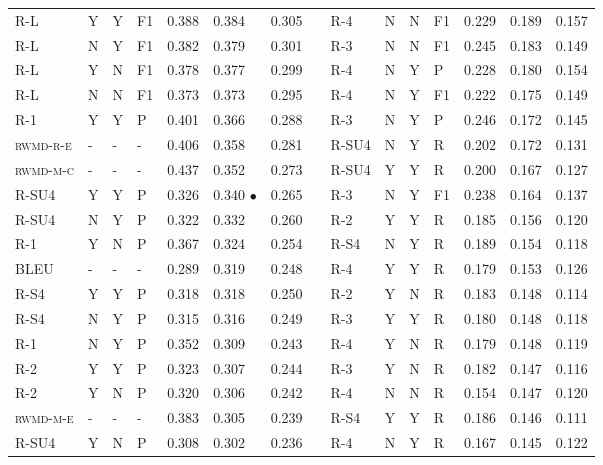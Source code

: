 \documentclass[11pt,a4paper]{article}
\begin{document}
\begin{table}[]
{\begin{tabular}{lllllllllllllll}
\textsc{R-L} & Y & Y & F1 & 0.388 & 0.384 & 0.305 &  & \textsc{R-4} & N & N & F1 & 0.229 & 0.189 & 0.157 \\
\textsc{R-L} & N & Y & F1 & 0.382 & 0.379 & 0.301 &  & \textsc{R-3} & N & N & F1 & 0.245 & 0.183 & 0.149 \\
\textsc{R-L} & Y & N & F1 & 0.378 & 0.377 & 0.299 &  & \textsc{R-4} & N & Y & P & 0.228 & 0.180 & 0.154 \\
\textsc{R-L} & N & N & F1 & 0.373 & 0.373 & 0.295 &  & \textsc{R-4} & N & Y & F1 & 0.222 & 0.175 & 0.149 \\
\textsc{R-1} & Y & Y & P & 0.401 & 0.366 & 0.288 &  & \textsc{R-3} & N & Y & P & 0.246 & 0.172 & 0.145 \\
\textsc{rwmd-r-e} & - & - & - & 0.406 & 0.358 & 0.281 &  & \textsc{R-SU4} & N & Y & R & 0.202 & 0.172 & 0.131 \\
\textsc{rwmd-m-c} & - & - & - & 0.437 & 0.352 & 0.273 &  & \textsc{R-SU4} & Y & Y & R & 0.200 & 0.167 & 0.127 \\
\textsc{R-SU4} & Y & Y & P & 0.326 & 0.340 $\bullet$ & 0.265 &  & \textsc{R-3} & N & Y & F1 & 0.238 & 0.164 & 0.137 \\
\textsc{R-SU4} & N & Y & P & 0.322 & 0.332 & 0.260 &  & \textsc{R-2} & Y & Y & R & 0.185 & 0.156 & 0.120 \\
\textsc{R-1} & Y & N & P & 0.367 & 0.324 & 0.254 &  & \textsc{R-S4} & N & Y & R & 0.189 & 0.154 & 0.118 \\
\textsc{BLEU} & - & - & - & 0.289 & 0.319 & 0.248 &  & \textsc{R-4} & Y & Y & R & 0.179 & 0.153 & 0.126 \\
\textsc{R-S4} & Y & Y & P & 0.318 & 0.318 & 0.250 &  & \textsc{R-2} & Y & N & R & 0.183 & 0.148 & 0.114 \\
\textsc{R-S4} & N & Y & P & 0.315 & 0.316 & 0.249 &  & \textsc{R-3} & Y & Y & R & 0.180 & 0.148 & 0.118 \\
\textsc{R-1} & N & Y & P & 0.352 & 0.309 & 0.243 &  & \textsc{R-4} & Y & N & R & 0.179 & 0.148 & 0.119 \\
\textsc{R-2} & Y & Y & P & 0.323 & 0.307 & 0.244 &  & \textsc{R-3} & Y & N & R & 0.182 & 0.147 & 0.116 \\
\textsc{R-2} & Y & N & P & 0.320 & 0.306 & 0.242 &  & \textsc{R-4} & N & N & R & 0.154 & 0.147 & 0.120 \\
\textsc{rwmd-m-e} & - & - & - & 0.383 & 0.305 & 0.239 &  & \textsc{R-S4} & Y & Y & R & 0.186 & 0.146 & 0.111 \\
\textsc{R-SU4} & Y & N & P & 0.308 & 0.302 & 0.236 &  & \textsc{R-4} & N & Y & R & 0.167 & 0.145 & 0.122 \\

\end{tabular}}
\end{table}
\end{document}
